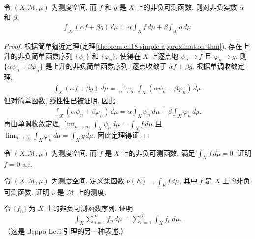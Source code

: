 \documentclass[../../main.tex]{subfiles}
\begin{document}
\begin{theorem}\label{theorem:ch18-nonneg-linearity}
令 $(X,\mathcal{M},\mu)$ 为测度空间, 而 $f$ 和 $g$ 是 $X$ 上的非负可测函数. 则对非负实数 $\alpha$ 和 $\beta$,
\begin{align*}
\int_{X}(\alpha f+\beta g)\,d\mu=\alpha\int_{X}f\,d\mu+\beta\int_{X}g\,d\mu.
\end{align*}
\end{theorem}

\begin{proof}
根据简单逼近定理(定理\cref{theorem:ch18-simple-approximation-thm}), 存在上升的非负简单函数序列 $\{\psi_{n}\}$ 和 $\{\varphi_{n}\}$, 使得在 $X$ 上逐点地 $\psi_{n}\to f$ 且 $\varphi_{n}\to g$. 则 $\{\alpha\psi_{n}+\beta\varphi_{n}\}$ 是上升的非负简单函数序列, 逐点收敛于 $\alpha f+\beta g$. 根据单调收敛定理,
\begin{align*}
\int_{X}(\alpha f+\beta g)\,d\mu=\lim_{n\to\infty}\int_{X}(\alpha\psi_{n}+\beta\varphi_{n})\,d\mu.
\end{align*}
但对简单函数, 线性性已被证明. 因此
\begin{align*}
\int_{X}(\alpha\psi_{n}+\beta\varphi_{n})\,d\mu=\alpha\int_{X}\psi_{n}\,d\mu+\beta\int_{X}\varphi_{n}\,d\mu.
\end{align*}
再由单调收敛定理, $\lim_{n\to\infty}\int_{X}\psi_{n}\,d\mu=\int_{X}f\,d\mu$ 且 $\lim_{n\to\infty}\int_{X}\varphi_{n}\,d\mu=\int_{X}g\,d\mu$. 因此定理得证.
\end{proof}

\begin{exercise}\label{exercise:ch18-17}
令 $(X,\mathcal{M},\mu)$ 为测度空间, 而 $f$ 是 $X$ 上的非负可测函数, 满足 $\int_{X}f\,d\mu=0$. 证明 $f=0$ a.e.
\end{exercise}

\begin{exercise}\label{exercise:ch18-18}
令 $(X,\mathcal{M},\mu)$ 为测度空间. 定义集函数 $\nu(E)=\int_{E}f\,d\mu$, 其中 $f$ 是 $X$ 上的非负可测函数. 证明 $\nu$ 是 $\mathcal{M}$ 上的测度.
\end{exercise}

\begin{exercise}\label{exercise:ch18-19}
令 $\{f_{n}\}$ 为 $X$ 上的非负可测函数序列. 证明
\begin{align*}
\int_{X}\sum_{n=1}^{\infty}f_{n}\,d\mu=\sum_{n=1}^{\infty}\int_{X}f_{n}\,d\mu.
\end{align*}
（这是 Beppo Levi 引理的另一种表述.）
\end{exercise}
\end{document}
